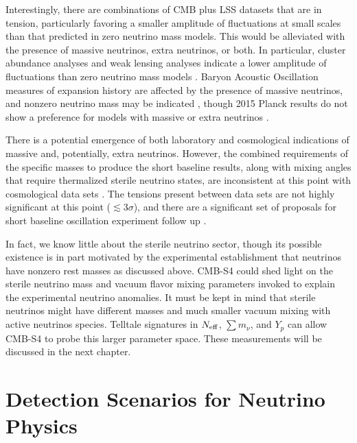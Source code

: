 Interestingly, there are combinations of CMB plus LSS
datasets that are in tension, particularly favoring a smaller amplitude of
fluctuations at small scales than that predicted in zero neutrino mass
models. This would be alleviated with the
presence of massive neutrinos, extra neutrinos, or both. In particular,
cluster abundance analyses \cite{Wyman:2013lza,Ade:2015fva} and weak lensing analyses
\cite{Battye:2013xqa} indicate a lower amplitude of
fluctuations than zero neutrino mass models \cite{Giusarma:2014zza}. Baryon Acoustic
Oscillation measures of expansion history are affected by the presence
of massive neutrinos, and nonzero neutrino mass may be indicated 
\cite{Beutler:2014yhv}, though 2015 Planck results do not show a preference for models with massive or extra neutrinos
\cite{Ade:2015xua}. 

There is a potential emergence of both laboratory and cosmological
indications of massive and, potentially, extra neutrinos. However, the
combined requirements of the specific masses to produce the short
baseline results, along with mixing angles that require thermalized
sterile neutrino states, are inconsistent at this point with
cosmological data sets
\cite{Joudaki:2012uk,Archidiacono:2013xxa}. The tensions present between data sets are
not highly significant at this point ($\lesssim 3\sigma$), and there
are a significant set of proposals for short baseline oscillation
experiment follow up \cite{Abazajian:2012ys}. 


In fact, we know little about the sterile neutrino sector, though its possible existence is in part motivated by the experimental establishment that neutrinos have nonzero rest masses as discussed above. CMB-S4 could shed light on the sterile neutrino mass and vacuum flavor mixing parameters invoked to explain the experimental neutrino anomalies. It must be kept in mind that sterile neutrinos might have different masses and much smaller vacuum mixing with active neutrinos species. Telltale signatures in $N_{\rm eff}$, $\sum m_{\nu}$, and $Y_p$ can allow CMB-S4 to probe this larger parameter space.  These measurements will be discussed in the next chapter.



\section{Detection Scenarios for Neutrino Physics} \label{sec:neuscenarios}

